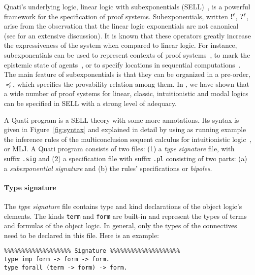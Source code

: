 \documentclass{llncs}
\newcommand{\nbang}[1]{\hbox{$!^{#1}$}}
\newcommand{\nquest}[1]{\hbox{$?^{#1}$}}
\begin{document}
Quati's underlying logic, linear logic with subexponentials
(SELL)~\cite{nigam09ppdp}, is a powerful framework for the specification of proof systems. 
Subexponentials, written $\nbang{\ell}$, $\nquest{\ell}$, arise from the
observation that the linear logic exponentials are not canonical (see
\cite{nigam.jlc} for an extensive discussion). It is known that these operators
greatly increase
the expressiveness of the system when compared to linear logic. For instance,
subexponentials can be used to represent contexts of proof
systems~\cite{nigam.jlc}, to mark the epistemic state of
agents~\cite{nigam12lics}, or to specify locations in sequential
computations~\cite{nigam09ppdp}. 
The main feature of subexponentials is that they can be organized in a pre-order, $\preceq$, which specifies
the provability relation among them. 
In \cite{nigam.jlc}, we have shown that a wide number of proof systems for linear, classic, intuitionistic and 
modal logics can be specified in SELL with a strong level of adequacy. 

A Quati program is a SELL theory with some more annotations. Its syntax is given
in Figure~\ref{fig:syntax} and explained in detail  
by using as running example the inference rules of the multiconclusion sequent
calculus for intuitionistic logic~\cite{maehara}, or MLJ.
%
A Quati program consists of two files: (1) a \emph{type signature} file, with
suffix \texttt{.sig} and (2) a specification file with suffix \texttt{.pl} consisting of two parts: (a) a
\emph{subexponential signature} and (b) the rules' specifications or
\emph{bipoles}.

\paragraph{Type signature}

The \emph{type signature} file contains type and kind declarations of the object
logic's elements. The kinds \texttt{term} and \texttt{form} are built-in and
represent the types of terms and formulas of the object logic. In general, only
the types of the connectives need to be declared in this file. Here is an
example:

{\footnotesize
\begin{verbatim}
%%%%%%%%%%%%%%%%%%% Signature %%%%%%%%%%%%%%%%%%%%
type imp form -> form -> form.
type forall (term -> form) -> form.
\end{verbatim}
}
\end{document}
